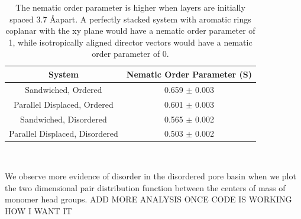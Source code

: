 \documentclass{article}
\begin{document}
  \begin{table}[h]
  \centering
  \begin{tabular}{cc}
  \toprule
  System & Nematic Order Parameter (S) \\
  \midrule
  Sandwiched, Ordered & 0.659 $\pm$ 0.003 \\
  Parallel Displaced, Ordered & 0.601 $\pm$ 0.003 \\
  Sandwiched, Disordered & 0.565 $\pm$ 0.002 \\
  Parallel Displaced, Disordered & 0.503 $\pm$ 0.002 \\
  \bottomrule
  \end{tabular}
  \caption{The nematic order parameter is higher when layers are initially spaced
  3.7 \AA apart. A perfectly stacked system with aromatic rings coplanar with the
  xy plane would have a nematic order parameter of 1, while isotropically aligned
  director vectors would have a nematic order parameter of 0.}~\label{table:nematic}
  \end{table}

  We observe more evidence of disorder in the disordered pore basin when we 
  plot the two dimensional pair distribution function between the centers of 
  mass of monomer head groups. ADD MORE ANALYSIS ONCE CODE IS WORKING HOW I WANT IT
\end{document}
